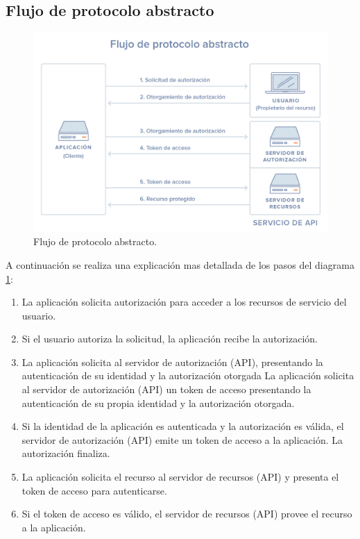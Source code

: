 \subsection{Flujo de protocolo abstracto}

\begin{figure}[!ht]
    \centering
    \includegraphics[scale=0.50]{TT/img/analisis/Abstract-Protocol-Flow-Spanish@2x.png}
    \caption{Flujo de protocolo abstracto. \cite{Anicas2018}}
    \label{graphic:OAuth2}
\end{figure}

A continuación se realiza una explicación mas detallada de los pasos del diagrama \ref{graphic:OAuth2}:

\begin{enumerate}
    \item La aplicación solicita autorización para acceder a los recursos de servicio del usuario.
    \item Si el usuario autoriza la solicitud, la aplicación recibe la autorización.
    \item La aplicación solicita al servidor de autorización (API), presentando la autenticación de su identidad y la autorización otorgada La aplicación solicita al servidor de autorización (API) un token de acceso presentando la autenticación de su propia identidad y la autorización otorgada.
    \item Si la identidad de la aplicación es autenticada y la autorización es válida, el servidor de autorización (API) emite un token de acceso a la aplicación. La autorización finaliza.
    \item La aplicación solicita el recurso al servidor de recursos (API) y presenta el token de acceso para autenticarse.
    \item Si el token de acceso es válido, el servidor de recursos (API) provee el recurso a la aplicación.
\end{enumerate}

